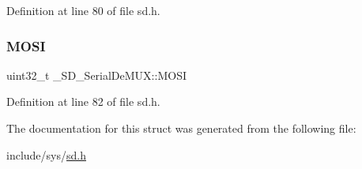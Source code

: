 Definition at line 80 of file sd.\+h.

\mbox{\label{struct__SD__SerialDeMUX_a6c0fa597d2f0baf4c256fab7a9bc2b4e}} 
\subsubsection{\texorpdfstring{MOSI}{MOSI}}
{\footnotesize\ttfamily uint32\+\_\+t \+\_\+\+S\+D\+\_\+\+Serial\+De\+M\+U\+X\+::\+M\+O\+SI}



Definition at line 82 of file sd.\+h.



The documentation for this struct was generated from the following file\+:\begin{DoxyCompactItemize}
\item 
include/sys/\mbox{\hyperlink{sd_8h}{sd.\+h}}\end{DoxyCompactItemize}
